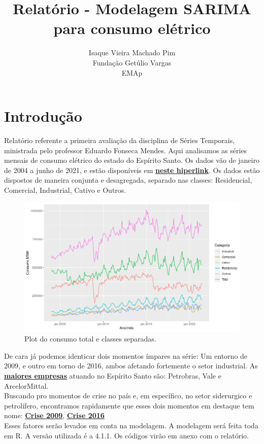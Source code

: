 \documentclass[10pt,a4paper]{article}
\author{Isaque Vieira Machado Pim \\
Fundação Getúlio Vargas \\
EMAp}
\title{Relatório - Modelagem SARIMA para consumo elétrico}
\begin{document}
\maketitle

\section{Introdução}
Relatório referente a primeira avaliação da disciplina de Séries Temporais, ministrada pelo professor Eduardo Fonseca Mendes. Aqui analisamos as séries mensais de consumo elétrico do estado do Espírito Santo. Os dados vão de janeiro de 2004 a junho de 2021, e estão disponíveis em \href{https://www.epe.gov.br/pt/publicacoes-dados-abertos/publicacoes/consumo-de-energia-eletrica}{\textbf{neste hiperlink}}. Os dados estão dispostos de maneira conjunta e desagregada, separado nas classes: Residencial, Comercial, Industrial, Cativo e Outros. 

\begin{figure}[h]
\centering
\includegraphics[width=.8 \linewidth]{../tudo.png} 
\caption{Plot do consumo total e classes separadas.}
\end{figure}

De cara já podemos identicar dois momentos ímpares na série: Um entorno de 2009, e outro em torno de 2016, ambos afetando fortemente o setor industrial. As \href{https://www.agazeta.com.br/es/economia/conheca-as-10-maiores-empresas-que-atuam-no-espirito-santo-1220}{\textbf{maiores empresas}} atuando no Espírito Santo são: Petrobras, Vale e  ArcelorMittal.\\ 
 Buscando pro momentos de crise no país e, em específico, no setor siderurgico e petrolífero, encontramos rapidamente que esses dois momentos em destaque tem nome:
\href{https://www1.folha.uol.com.br/fsp/dinheiro/fi1012200837.htm}{\textbf{Crise 2009}},  \href{https://www.manufaturaemfoco.com.br/a-crise-que-abalou-a-siderurgia/#:~:text=A\%20ind\%C3\%BAstria\%20sider\%C3\%BArgica\%20brasileira\%20viveu,j\%C3\%A1\%20cr\%C3\%ADtico\%20ano\%20de\%202015.}{\textbf{Crise 2016}}\\
Esses fatores serão levados em conta na modelagem. A modelagem será feita toda em R. A versão utilizada é a 4.1.1. Os códigos virão em anexo com o relatório.
\end{document}
